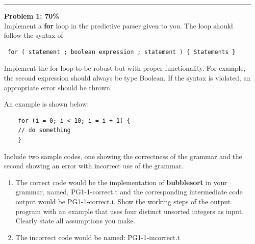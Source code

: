 \documentclass[a4paper, 11pt]{article}
\newenvironment{problem}[2][Problem]
    { \begin{mdframed}[backgroundcolor=gray!20] \textbf{#1 #2} \\}
    {  \end{mdframed}}
\begin{document}
\noindent\rule{7in}{2.8pt}
\begin{problem}{1: 70\%}
Implement a \textbf{for} loop in the predictive parser given to you. The loop should follow the syntax of \begin{verbatim} for ( statement ; boolean expression ; statement ) { Statements }
\end {verbatim}
Implement the for loop to be robust but with proper functionality. For example, the second expression should always be type Boolean. If the syntax is violated, an appropriate error should be thrown.

\vspace{\baselineskip} 
\noindent An example is shown below:
\begin{verbatim}
    for (i = 0; i < 10; i = i + 1) {
    // do something
    }
\end{verbatim}

\vspace{\baselineskip}

\noindent Include two sample codes, one showing the correctness of the grammar and the second showing an error with incorrect use of the grammar.

\begin{enumerate}
    \item The correct code would be the implementation of \textbf{bubblesort} in your grammar, named, PG1-1-correct.t and the corresponding intermediate code output would be PG1-1-correct.i. Show the working steps of the output program with an example that uses four distinct unsorted integers as input. Clearly state all assumptions you make.
    \item The incorrect code would be named: PG1-1-incorrect.t
\end{enumerate}
\end{problem}
\end{document}
